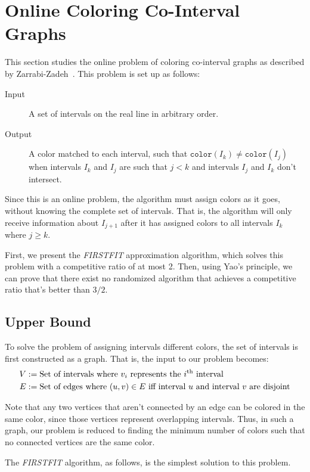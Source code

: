 \section{Online Coloring Co-Interval Graphs}
This section studies the online problem of coloring co-interval graphs as described by \hbox{Zarrabi-Zadeh}~\cite{zarrabi}.
This problem is set up as follows:

\begin{description}
	\item[Input] A set of intervals on the real line in arbitrary order.
	\item[Output] A color matched to each interval, such that $\texttt{color}(I_k) \neq \texttt{color}(I_j)$ when intervals $I_k$ and $I_j$ are such that $j < k$ and intervals $I_j$ and $I_k$ don't intersect.
\end{description}

Since this is an online problem, the algorithm must assign colors as it goes, without knowing the complete set of intervals. That is, the algorithm will only receive information about $I_{j+1}$ after it has assigned colors to all intervals $I_k$ where $j \geq k$.

First, we present the \emph{FIRSTFIT} approximation algorithm, which solves this problem with a competitive ratio of at most 2. Then, using Yao's principle, we can prove that there exist no randomized algorithm that achieves a competitive ratio that's better than $3/2$.

\subsection{Upper Bound}
To solve the problem of assigning intervals different colors, the set of intervals is first constructed as a graph. That is, the input to our problem becomes:
\begin{align*}
	V &:= \text{Set of intervals where $v_i$ represents the $i$\textsuperscript{th} interval} \\
		E &:= \text{Set of edges where $(u,v) \in E$ iff interval $u$ and interval $v$ are disjoint}
\end{align*}

Note that any two vertices that aren't connected by an edge can be colored in the same color, since those vertices represent overlapping intervals. Thus, in such a graph, our problem is reduced to finding the minimum number of colors such that no connected vertices are the same color.

The \emph{FIRSTFIT} algorithm, as follows, is the simplest solution to this problem.

